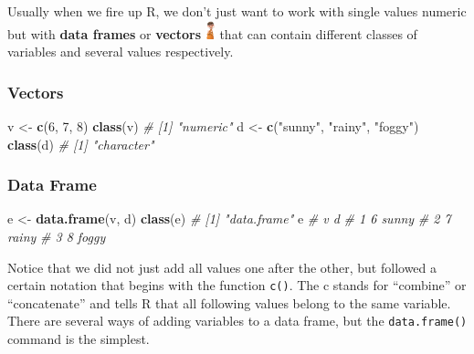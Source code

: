 \documentclass[
]{book}
\newenvironment{Shaded}{\begin{snugshade}}{\end{snugshade}}
\newcommand{\CommentTok}[1]{\textcolor[rgb]{0.56,0.35,0.01}{\textit{#1}}}
\newcommand{\DecValTok}[1]{\textcolor[rgb]{0.00,0.00,0.81}{#1}}
\newcommand{\FunctionTok}[1]{\textcolor[rgb]{0.13,0.29,0.53}{\textbf{#1}}}
\newcommand{\NormalTok}[1]{#1}
\newcommand{\OtherTok}[1]{\textcolor[rgb]{0.56,0.35,0.01}{#1}}
\newcommand{\StringTok}[1]{\textcolor[rgb]{0.31,0.60,0.02}{#1}}
\begin{document}
Usually when we fire up R, we don't just want to work with single values numeric but with \textbf{data frames} or \textbf{vectors} \includegraphics[width=\textwidth,height=0.20833in]{./img/vector.png} that can contain different classes of variables and several values respectively.

\subsubsection*{Vectors}\label{vectors}

\begin{Shaded}
\begin{Highlighting}[]
\NormalTok{v }\OtherTok{\textless{}{-}} \FunctionTok{c}\NormalTok{(}\DecValTok{6}\NormalTok{, }\DecValTok{7}\NormalTok{, }\DecValTok{8}\NormalTok{)}
\FunctionTok{class}\NormalTok{(v)}
\CommentTok{\# [1] "numeric"}
\NormalTok{d }\OtherTok{\textless{}{-}} \FunctionTok{c}\NormalTok{(}\StringTok{"sunny"}\NormalTok{, }\StringTok{"rainy"}\NormalTok{, }\StringTok{"foggy"}\NormalTok{)}
\FunctionTok{class}\NormalTok{(d)}
\CommentTok{\# [1] "character"}
\end{Highlighting}
\end{Shaded}

\subsubsection*{Data Frame}\label{data-frame}

\begin{Shaded}
\begin{Highlighting}[]
\NormalTok{e }\OtherTok{\textless{}{-}} \FunctionTok{data.frame}\NormalTok{(v, d)}
\FunctionTok{class}\NormalTok{(e)}
\CommentTok{\# [1] "data.frame"}
\NormalTok{e}
\CommentTok{\#   v     d}
\CommentTok{\# 1 6 sunny}
\CommentTok{\# 2 7 rainy}
\CommentTok{\# 3 8 foggy}
\end{Highlighting}
\end{Shaded}

Notice that we did not just add all values one after the other, but followed a certain notation that begins with the function \texttt{c()}.
The c stands for ``combine'' or ``concatenate'' and tells R that all following values belong to the same variable.
There are several ways of adding variables to a data frame, but the \texttt{data.frame()} command is the simplest.
\end{document}
